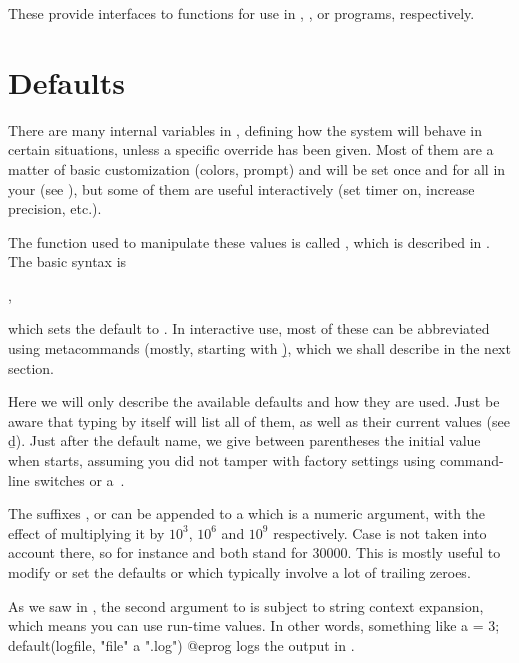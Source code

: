 These provide interfaces to  functions for use in
, , or 
programs, respectively.

\section{Defaults}
\label{se:defaults}

\noindent There are many internal variables in , defining how the
system will behave in certain situations, unless a specific override has been
given. Most of them are a matter of basic customization (colors, prompt) and
will be set once and for all in your  (see
), but some of them are useful interactively (set timer on,
increase precision, etc.).

The function used to manipulate these values is called , which
is described in . The basic syntax is

,

\noindent which sets the default  to . In interactive
use, most of these can be abbreviated using  metacommands
(mostly, starting with \b), which we shall describe in the next section.

Here we will only describe the available defaults and how they are used. Just
be aware that typing  by itself will list all of them, as well
as their current values (see \b{d}). Just after the default name, we give
between parentheses the initial value when  starts, assuming you did
not tamper with factory settings using command-line switches or a~.

 The suffixes ,  or  can be appended to
a  which is a numeric argument, with the effect of multiplying it
by $10^3$, $10^6$ and $10^9$ respectively. Case is not taken into account
there, so for instance  and  both stand for $30000$. This
is mostly useful to modify or set the defaults  or
 which typically involve a lot of trailing zeroes.

 As we saw in ,
the second argument to  is subject to string context
expansion, which means you can use run-time values. In other words, something
like
\bprog
  a = 3;
  default(logfile, "file" a ".log")
@eprog
logs the output in .

